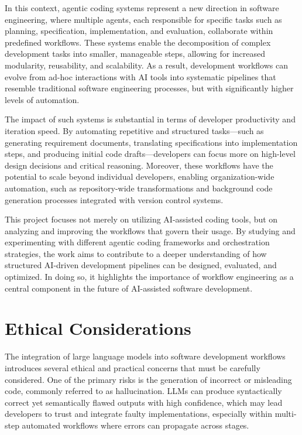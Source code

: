 \documentclass[a4paper,12pt]{report}
\begin{document}
In this context, agentic coding systems represent a new direction in software engineering, where multiple agents, each responsible for specific tasks such as planning, specification, implementation, and evaluation, collaborate within predefined workflows. These systems enable the decomposition of complex development tasks into smaller, manageable steps, allowing for increased modularity, reusability, and scalability. As a result, development workflows can evolve from ad-hoc interactions with AI tools into systematic pipelines that resemble traditional software engineering processes, but with significantly higher levels of automation.

The impact of such systems is substantial in terms of developer productivity and iteration speed. By automating repetitive and structured tasks---such as generating requirement documents, translating specifications into implementation steps, and producing initial code drafts---developers can focus more on high-level design decisions and critical reasoning. Moreover, these workflows have the potential to scale beyond individual developers, enabling organization-wide automation, such as repository-wide transformations and background code generation processes integrated with version control systems.

This project focuses not merely on utilizing AI-assisted coding tools, but on analyzing and improving the workflows that govern their usage. By studying and experimenting with different agentic coding frameworks and orchestration strategies, the work aims to contribute to a deeper understanding of how structured AI-driven development pipelines can be designed, evaluated, and optimized. In doing so, it highlights the importance of workflow engineering as a central component in the future of AI-assisted software development.
\section{Ethical Considerations}
The integration of large language models into software development workflows introduces several ethical and practical concerns that must be carefully considered. One of the primary risks is the generation of incorrect or misleading code, commonly referred to as hallucination. LLMs can produce syntactically correct yet semantically flawed outputs with high confidence, which may lead developers to trust and integrate faulty implementations, especially within multi-step automated workflows where errors can propagate across stages.
\end{document}
